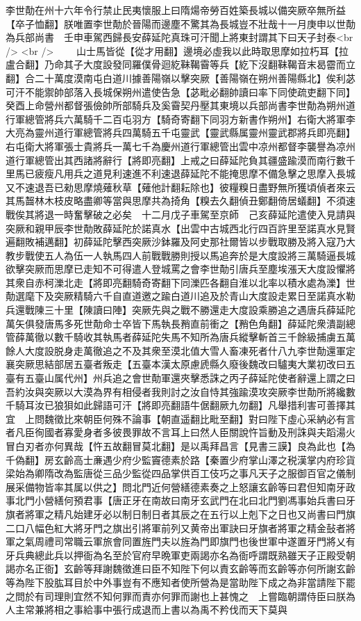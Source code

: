 李世勣在州十六年令行禁止民夷懷服上曰隋煬帝勞百姓築長城以備突厥卒無所益【卒子恤翻】朕唯置李世勣於晉陽而邊塵不驚其為長城豈不壯哉十一月庚申以世勣為兵部尚書　壬申車駕西歸長安薛延陀真珠可汗聞上將東封謂其下曰天子封泰<br />
<br />
　　山士馬皆從【從才用翻】邊境必虛我以此時取思摩如拉朽耳【拉盧合翻】乃命其子大度設發同羅僕骨迴紇靺鞨霫等兵【紇下沒翻靺鞨音末曷霤而立翻】合二十萬度漠南屯白道川據善陽嶺以擊突厥【善陽嶺在朔州善陽縣北】俟利苾可汗不能禦帥部落入長城保朔州遣使告急【苾毗必翻帥讀曰率下同使疏吏翻下同】癸酉上命營州都督張儉帥所部騎兵及奚霫契丹壓其東境以兵部尚書李世勣為朔州道行軍總管將兵六萬騎千二百屯羽方【騎奇寄翻下同羽方新書作朔州】右衛大將軍李大亮為靈州道行軍總管將兵四萬騎五千屯靈武【靈武縣属靈州靈武郡將兵即亮翻】右屯衛大將軍張士貴將兵一萬七千為慶州道行軍總管出雲中凉州都督李襲譽為凉州道行軍總管出其西諸將辭行【將即亮翻】上戒之曰薛延陀負其疆盛踰漠而南行數千里馬已疲瘦凡用兵之道見利速進不利速退薛延陀不能掩思摩不備急擊之思摩入長城又不速退吾已勑思摩燒薙秋草【薙他計翻耘除也】彼糧糗日盡野無所獲頃偵者來云其馬齧林木枝皮略盡卿等當與思摩共為掎角【糗去久翻偵丑鄭翻倚居蟻翻】不須速戰俟其將退一時奮擊破之必矣　十二月戊子車駕至京師　己亥薛延陀遣使入見請與突厥和親甲辰李世勣敗薛延陀於諾真水【出雲中古城西北行四百許里至諾真水見賢遍翻敗補邁翻】初薛延陀擊西突厥沙鉢羅及阿史那社爾皆以步戰取勝及將入寇乃大教步戰使五人為伍一人執馬四人前戰戰勝則授以馬追奔於是大度設將三萬騎逼長城欲擊突厥而思摩已走知不可得遣人登城罵之會李世勣引唐兵至塵埃漲天大度設懼將其衆自赤柯濼北走【將即亮翻騎奇寄翻下同濼匹各翻自淮以北率以積水處為濼】世勣選麾下及突厥精騎六千自直道邀之踰白道川追及於青山大度設走累日至諾真水勒兵還戰陳三十里【陳讀曰陣】突厥先與之戰不勝還走大度設乘勝追之遇唐兵薛延陀萬矢俱發唐馬多死世勣命士卒皆下馬執長矟直前衝之【矟色角翻】薛延陀衆潰副總管薛萬徹以數千騎收其執馬者薛延陀失馬不知所為唐兵縱擊斬首三千餘級捕虜五萬餘人大度設脱身走萬徹追之不及其衆至漠北值大雪人畜凍死者什八九李世勣還軍定襄突厥思結部居五臺者叛走【五臺本漢太原慮虒縣久廢後魏改曰驢夷大業初改曰五臺有五臺山属代州】州兵追之會世勣軍還夾擊悉誅之丙子薛延陀使者辭還上謂之曰吾約汝與突厥以大漠為界有相侵者我則討之汝自恃其強踰漠攻突厥李世勣所將纔數千騎耳汝已狼狽如此歸語可汗【將即亮翻語牛倨翻厥九勿翻】凡舉措利害可善擇其宜　上問魏徵比來朝臣何殊不論事【朝直遥翻比毗至翻】對曰陛下虛心采納必有言者凡臣徇國者寡愛身者多彼畏罪故不言耳上曰然人臣關說忤旨動及刑誅與夫蹈湯火冒白刃者亦何異哉【忤五故翻冒莫北翻】是以禹拜昌言【見書三謨】良為此也【為千偽翻】房玄齡高士亷遇少府少監竇德素於路【秦置少府掌山澤之税漢掌内府珍貨梁始為卿隋改為監唐從三品少監從四品掌供百工伎巧之事凡天子之服御百官之儀制展采備物皆率其属以供之】問北門近何營繕德素奏之上怒讓玄齡等曰君但知南牙政事北門小營繕何預君事【唐正牙在南故曰南牙玄武門在北曰北門劉馮事始兵書曰牙旗者將軍之精凡始建牙必以制日制日者其辰之在五行以上剋下之日也又尚書曰門旗二口八幅色紅大將牙門之旗出引將軍前列又黄帝出軍訣曰牙旗者將軍之精金鼔者將軍之氣周禮司常職云軍旅會同置旌門夫以旌為門即旗門也後世軍中遂置牙門將乂有牙兵典總此兵以押衙為名至於官府早晩軍吏兩謁亦名為衙呼謂既熟雖天子正殿受朝謁亦名正衙】玄齡等拜謝魏徵進曰臣不知陛下何以責玄齡等而玄齡等亦何所謝玄齡等為陛下股肱耳目於中外事豈有不應知者使所營為是當助陛下成之為非當請陛下罷之問於有司理則宜然不知何罪而責亦何罪而謝也上甚愧之　上嘗臨朝謂侍臣曰朕為人主常兼將相之事給事中張行成退而上書以為禹不矜伐而天下莫與